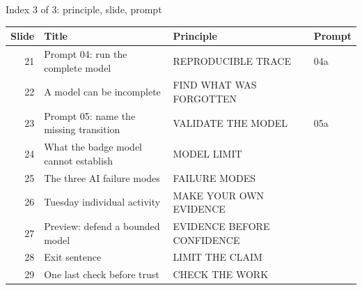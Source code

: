 \begin{frame}{Index 3 of 3: principle, slide, prompt}
\scriptsize
\begin{tabular}{@{}r>{\raggedright\arraybackslash}p{5.0cm}>{\raggedright\arraybackslash}p{4.8cm}p{1.1cm}@{}}
\textbf{Slide} & \textbf{Title} & \textbf{Principle} & \textbf{Prompt}\\\midrule
21 & Prompt 04: run the complete model & REPRODUCIBLE TRACE & 04a\\
22 & A model can be incomplete & FIND WHAT WAS FORGOTTEN & \\
23 & Prompt 05: name the missing transition & VALIDATE THE MODEL & 05a\\
24 & What the badge model cannot establish & MODEL LIMIT & \\
25 & The three AI failure modes & FAILURE MODES & \\
26 & Tuesday individual activity & MAKE YOUR OWN EVIDENCE & \\
27 & Preview: defend a bounded model & EVIDENCE BEFORE CONFIDENCE & \\
28 & Exit sentence & LIMIT THE CLAIM & \\
29 & One last check before trust & CHECK THE WORK & \\
\end{tabular}
\end{frame}
